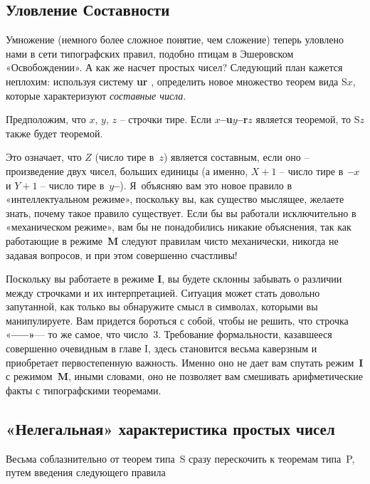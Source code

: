 \documentclass[../main.tex]{subfiles}
\begin{document}
\subsection{Уловление Составности}

Умножение (немного более сложное понятие, чем сложение) теперь уловлено нами в сети типографских правил, подобно птицам в Эшеровском «Освобождении».
А как же насчет простых чисел?
Следующий план кажется неплохим: используя систему \textbf{ur} , определить новое множество теорем вида S$x$, которые характеризуют \emph{составные числа}.

\begin{tcolorbox}[title={ПРАВИЛО}]
    Предположим, что $x$, $y$, $z$ \--- строчки тире.
    Если \textbf{$x$--u$y$--r$z$} является теоремой, то S$z$ также будет теоремой.
\end{tcolorbox}

Это означает, что $Z$ (число тире в~$z$) является составным, если оно \--- произведение двух чисел, больших единицы (а именно, $X + 1$ \--- число тире в~\textbf{--$x$} и $Y + 1$ \--- число тире в~\textbf{$y$--}).
Я~объясняю вам это новое правило в «интеллектуальном режиме», поскольку вы, как существо мыслящее, желаете знать, почему такое правило существует.
Если бы вы работали исключительно в «механическом режиме», вам бы не понадобились никакие объяснения, так как работающие в режиме~\textbf{M} следуют правилам чисто механически, никогда не задавая вопросов, и при этом совершенно счастливы!

Поскольку вы работаете в режиме \textbf{I}, вы будете склонны забывать о различии между строчками и их интерпретацией. Ситуация может стать довольно запутанной, как только вы обнаружите смысл в символах, которыми вы манипулируете.
Вам придется бороться с собой, чтобы не решить, что строчка «\textbf{--{}--{}--»}--- то же самое, что число~3.
Требование формальности, казавшееся совершенно очевидным в главе I, здесь становится весьма каверзным и приобретает первостепенную важность.
Именно оно не дает вам спутать режим~\textbf{I} с режимом~\textbf{M}, иными словами, оно не позволяет вам смешивать арифметические факты с типографскими теоремами.


\subsection{«Нелегальная» характеристика простых чисел}

Весьма соблазнительно от теорем типа~S сразу перескочить к теоремам типа~P, путем введения следующего правила
\end{document}
